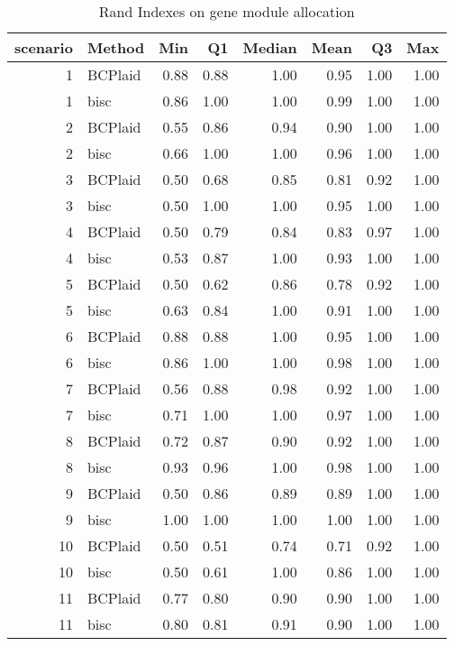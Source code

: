 \begin{table}[ht]
\caption{Rand Indexes on gene module allocation}
\vspace{1.5cm}
\centering
\begin{tabular}{rlrrrrrr}
  \toprule
scenario & Method & Min & Q1 & Median & Mean & Q3 & Max \\ 
  \midrule
  1 & BCPlaid & 0.88 & 0.88 & 1.00 & 0.95 & 1.00 & 1.00 \\ 
    1 & bisc & 0.86 & 1.00 & 1.00 & 0.99 & 1.00 & 1.00 \\ 
    2 & BCPlaid & 0.55 & 0.86 & 0.94 & 0.90 & 1.00 & 1.00 \\ 
    2 & bisc & 0.66 & 1.00 & 1.00 & 0.96 & 1.00 & 1.00 \\ 
    3 & BCPlaid & 0.50 & 0.68 & 0.85 & 0.81 & 0.92 & 1.00 \\ 
    3 & bisc & 0.50 & 1.00 & 1.00 & 0.95 & 1.00 & 1.00 \\ 
    4 & BCPlaid & 0.50 & 0.79 & 0.84 & 0.83 & 0.97 & 1.00 \\ 
    4 & bisc & 0.53 & 0.87 & 1.00 & 0.93 & 1.00 & 1.00 \\ 
    5 & BCPlaid & 0.50 & 0.62 & 0.86 & 0.78 & 0.92 & 1.00 \\ 
    5 & bisc & 0.63 & 0.84 & 1.00 & 0.91 & 1.00 & 1.00 \\ 
    6 & BCPlaid & 0.88 & 0.88 & 1.00 & 0.95 & 1.00 & 1.00 \\ 
    6 & bisc & 0.86 & 1.00 & 1.00 & 0.98 & 1.00 & 1.00 \\ 
    7 & BCPlaid & 0.56 & 0.88 & 0.98 & 0.92 & 1.00 & 1.00 \\ 
    7 & bisc & 0.71 & 1.00 & 1.00 & 0.97 & 1.00 & 1.00 \\ 
    8 & BCPlaid & 0.72 & 0.87 & 0.90 & 0.92 & 1.00 & 1.00 \\ 
    8 & bisc & 0.93 & 0.96 & 1.00 & 0.98 & 1.00 & 1.00 \\ 
    9 & BCPlaid & 0.50 & 0.86 & 0.89 & 0.89 & 1.00 & 1.00 \\ 
    9 & bisc & 1.00 & 1.00 & 1.00 & 1.00 & 1.00 & 1.00 \\ 
   10 & BCPlaid & 0.50 & 0.51 & 0.74 & 0.71 & 0.92 & 1.00 \\ 
   10 & bisc & 0.50 & 0.61 & 1.00 & 0.86 & 1.00 & 1.00 \\ 
   11 & BCPlaid & 0.77 & 0.80 & 0.90 & 0.90 & 1.00 & 1.00 \\ 
   11 & bisc & 0.80 & 0.81 & 0.91 & 0.90 & 1.00 & 1.00 \\ 

\end{tabular}
\end{table}
